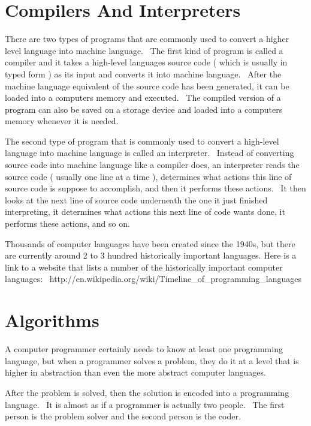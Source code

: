 \documentclass[12pt,twoside]{book}
\begin{document}
\section[Compilers And Interpreters]{Compilers And
Interpreters}
There are two types of programs that are commonly used to convert a
higher level language into machine language. \ The first kind of
program is called a compiler and it takes a high{}-level
language{\textquotesingle}s source code ( which is usually in typed
form ) as its input and converts it into machine language. \ After the
machine language equivalent of the source code has been generated, it
can be loaded into a computer{\textquotesingle}s memory and executed.
\ The compiled version of a program can also be saved on a storage
device and loaded into a computer{\textquotesingle}s memory whenever it
is needed.


\bigskip

The second type of program that is commonly used to convert a
high{}-level language into machine language is called an interpreter.
\ Instead of converting source code into machine language like a
compiler does, an interpreter reads the source code ( usually one line
at a time ), determines what actions this line of source code is
suppose to accomplish, and then it performs these actions. \ It then
looks at the next line of source code underneath the one it just
finished interpreting, it determines what actions this next line of
code wants done, it performs these actions, and so on.


\bigskip

Thousands of computer languages have been created since the
1940{\textquotesingle}s, but there are currently around 2 to 3 hundred
historically important languages. Here is a link to a website that
lists a number of the historically important computer languages:
\ http://en.wikipedia.org/wiki/Timeline\_of\_programming\_languages 

\section[Algorithms]{Algorithms}
A computer programmer certainly needs to know at least one programming
language, but when a programmer solves a problem, they do it at a level
that is higher in abstraction than even the more abstract computer
languages. \ 


\bigskip

After the problem is solved, then the solution is encoded into a
programming language. \ It is almost as if a programmer is actually two
people. \ The first person is the problem solver and the second person
is the coder. 
\end{document}
